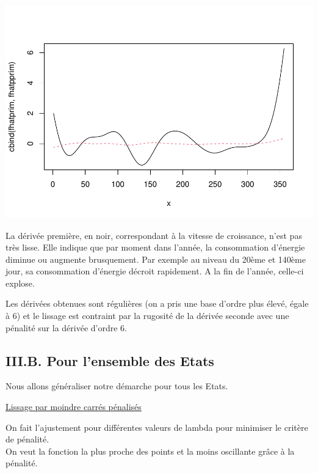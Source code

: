 \documentclass[
]{article}
\begin{document}
\includegraphics{Projet_CHESNAIS_GUIBERT_files/figure-latex/unnamed-chunk-27-1.pdf}

La dérivée première, en noir, correspondant à la vitesse de croissance,
n'est pas très lisse. Elle indique que par moment dans l'année, la
consommation d'énergie diminue ou augmente brusquement. Par exemple au
niveau du 20ème et 140ème jour, sa consommation d'énergie décroit
rapidement. A la fin de l'année, celle-ci explose.

Les dérivées obtenues sont régulières (on a pris une base d'ordre plus
élevé, égale à 6) et le lissage est contraint par la rugosité de la
dérivée seconde avec une pénalité sur la dérivée d'ordre 6.

\hypertarget{iii.b.-pour-lensemble-des-etats}{%
\subsection{III.B. Pour l'ensemble des
Etats}\label{iii.b.-pour-lensemble-des-etats}}

Nous allons généraliser notre démarche pour tous les Etats.

\uline{Lissage par moindre carrés pénalisés}

On fait l'ajustement pour différentes valeurs de lambda pour minimiser
le critère de pénalité.\\
On veut la fonction la plus proche des points et la moins oscillante
grâce à la pénalité.
\end{document}
